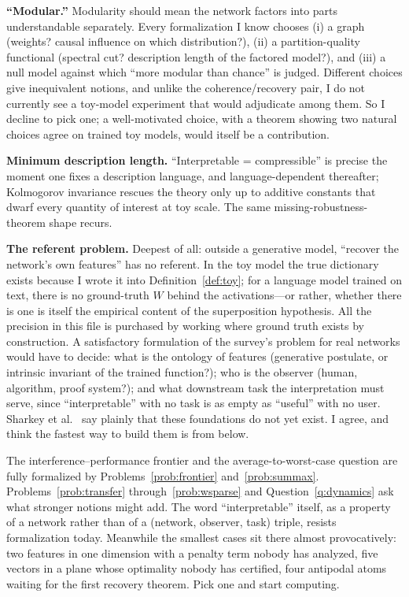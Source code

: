 \documentclass[11pt]{amsart}
\theoremstyle{plain}
\theoremstyle{definition}
\begin{document}
\textbf{``Modular.''} Modularity should mean the network factors into parts understandable separately. Every formalization I know chooses (i) a graph (weights? causal influence on which distribution?), (ii) a partition-quality functional (spectral cut? description length of the factored model?), and (iii) a null model against which ``more modular than chance'' is judged. Different choices give inequivalent notions, and unlike the coherence/recovery pair, I do not currently see a toy-model experiment that would adjudicate among them. So I decline to pick one; a well-motivated choice, with a theorem showing two natural choices agree on trained toy models, would itself be a contribution.

\textbf{Minimum description length.} ``Interpretable = compressible'' \cite{ayonrinde2024,braun2025} is precise the moment one fixes a description language, and language-dependent thereafter; Kolmogorov invariance rescues the theory only up to additive constants that dwarf every quantity of interest at toy scale. The same missing-robustness-theorem shape recurs.

\textbf{The referent problem.} Deepest of all: outside a generative model, ``recover the network's own features'' has no referent. In the toy model the true dictionary exists because I wrote it into Definition~\ref{def:toy}; for a language model trained on text, there is no ground-truth $W$ behind the activations---or rather, whether there is one is itself the empirical content of the superposition hypothesis. All the precision in this file is purchased by working where ground truth exists by construction. A satisfactory formulation of the survey's problem for real networks would have to decide: what is the ontology of features (generative postulate, or intrinsic invariant of the trained function?); who is the observer (human, algorithm, proof system?); and what downstream task the interpretation must serve, since ``interpretable'' with no task is as empty as ``useful'' with no user. Sharkey et al.\ \cite{sharkey2025} say plainly that these foundations do not yet exist. I agree, and think the fastest way to build them is from below.

The interference--performance frontier and the average-to-worst-case question are fully formalized by Problems~\ref{prob:frontier} and~\ref{prob:summax}. Problems~\ref{prob:transfer} through~\ref{prob:wsparse} and Question~\ref{q:dynamics} ask what stronger notions might add. The word ``interpretable'' itself, as a property of a network rather than of a (network, observer, task) triple, resists formalization today. Meanwhile the smallest cases sit there almost provocatively: two features in one dimension with a penalty term nobody has analyzed, five vectors in a plane whose optimality nobody has certified, four antipodal atoms waiting for the first recovery theorem. Pick one and start computing.
\end{document}
